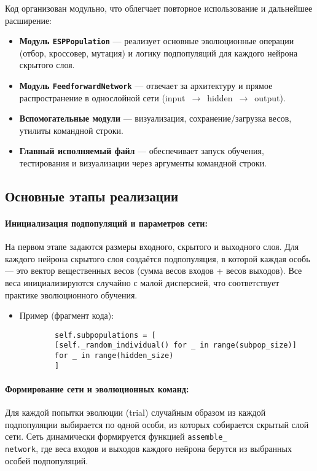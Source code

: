 \documentclass[a4paper,12pt]{article}
\begin{document}
Код организован модульно, что облегчает повторное использование и дальнейшее расширение:
\begin{itemize}
	\item \textbf{Модуль \texttt{ESPPopulation}} — реализует основные эволюционные операции (отбор, кроссовер, мутация) и логику подпопуляций для каждого нейрона скрытого слоя.
	\item \textbf{Модуль \texttt{FeedforwardNetwork}} — отвечает за архитектуру и прямое распространение в однослойной сети (input~$\rightarrow$~hidden~$\rightarrow$~output).
	\item \textbf{Вспомогательные модули} — визуализация, сохранение/загрузка весов, утилиты командной строки.
	\item \textbf{Главный исполняемый файл} — обеспечивает запуск обучения, тестирования и визуализации через аргументы командной строки.
\end{itemize}

\subsection{Основные этапы реализации}

\paragraph{Инициализация подпопуляций и параметров сети:}

На первом этапе задаются размеры входного, скрытого и выходного слоя. Для каждого нейрона скрытого слоя создаётся подпопуляция, в которой каждая особь — это вектор вещественных весов (сумма весов входов + весов выходов). Все веса инициализируются случайно с малой дисперсией, что соответствует практике эволюционного обучения.

\begin{itemize}
	\item[] Пример (фрагмент кода):
	\begin{lstlisting}
		self.subpopulations = [
		[self._random_individual() for _ in range(subpop_size)]
		for _ in range(hidden_size)
		]
	\end{lstlisting}
\end{itemize}

\paragraph{Формирование сети и эволюционных команд:}

Для каждой попытки эволюции (trial) случайным образом из каждой подпопуляции выбирается по одной особи, из которых собирается скрытый слой сети. Сеть динамически формируется функцией \texttt{assemble\_}\\\texttt{network}, где веса входов и выходов каждого нейрона берутся из выбранных особей подпопуляций.
\end{document}
